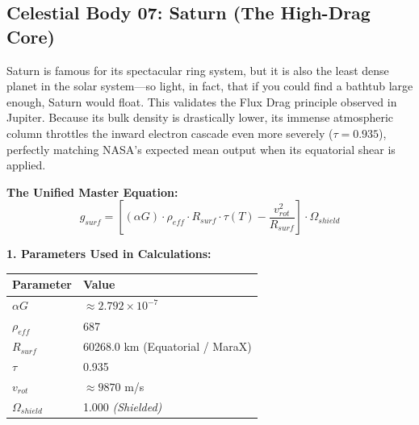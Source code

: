 \documentclass[11pt, a4paper]{article}
\begin{document}
\clearpage
\subsection{Celestial Body 07: Saturn (The High-Drag Core)}
  Saturn is famous for its spectacular ring system, but it is also the least dense planet in the solar system—so light, in fact, that if you could find a bathtub large enough, Saturn would float. This validates the Flux Drag principle observed in Jupiter. Because its bulk density is drastically lower, its immense atmospheric column throttles the inward electron cascade even more severely ($\tau = 0.935$), perfectly matching NASA's expected mean output when its equatorial shear is applied.

  \vspace{0.5em}
  \noindent \textbf{The Unified Master Equation:}
  $$ g_{surf} = \left[ (\alpha G) \cdot \rho_{eff} \cdot R_{surf} \cdot \tau(T) - \frac{v_{rot}^2}{R_{surf}} \right] \cdot \Omega_{shield} $$

  \vspace{0.5em}
  \noindent \textbf{1. Parameters Used in Calculations:} \\[0.5em]
  \begingroup
  \renewcommand{\arraystretch}{1.3}
  \hspace*{2em}
  \begin{tabular}{|l|l|}
    \hline
    \textbf{Parameter} & \textbf{Value} \\ \hline
    $\alpha G$ & $\approx 2.792 \times 10^{-7}$ \\ \hline
    $\rho_{eff}$ & 687 \\ \hline
    $R_{surf}$ & 60268.0 km (Equatorial / MaraX) \\ \hline
    $\tau$ & 0.935 \\ \hline
    $v_{rot}$ & $\approx 9870$ m/s \\ \hline
    $\Omega_{shield}$ & 1.000 \textit{(Shielded)} \\ \hline
  \end{tabular}
  \endgroup
\end{document}
